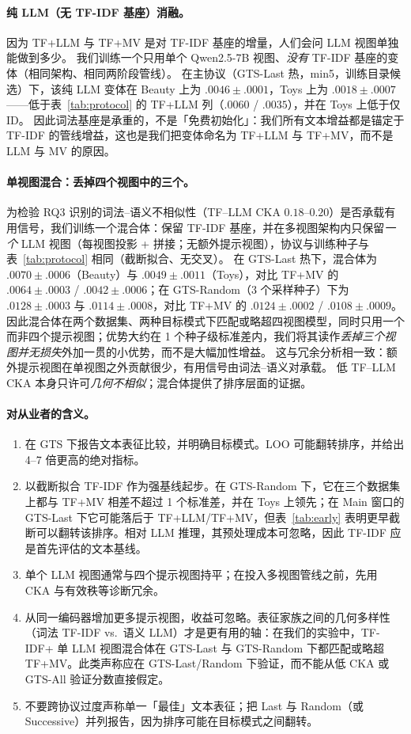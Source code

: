 \documentclass[sigconf,natbib=true,anonymous]{acmart}
\newcommand{\tfidf}{\textsc{TF-IDF}\xspace}
\newcommand{\llm}{\textsc{LLM}\xspace}
\newcommand{\tfllm}{\textsc{TF+LLM}\xspace}
\newcommand{\tfmv}{\textsc{TF+MV}\xspace}
\begin{document}
\paragraph{纯 LLM（无 \tfidf 基座）消融。}
因为 \tfllm 与 \tfmv 是对 \tfidf 基座的增量，人们会问 LLM 视图单独能做到多少。
我们训练一个只用单个 Qwen2.5-7B 视图、\emph{没有} \tfidf 基座的变体（相同架构、相同两阶段管线）。
在主协议（GTS-Last 热，min5，训练目录候选）下，该纯 LLM 变体在 Beauty 上为 $.0046\pm.0001$，Toys 上为 $.0018\pm.0007$——低于表~\ref{tab:protocol} 的 \tfllm 列（$.0060$ / $.0035$），并在 Toys 上低于仅 ID。
因此词法基座是承重的，不是「免费初始化」：我们所有文本增益都是锚定于 \tfidf 的管线增益，这也是我们把变体命名为 \tfllm 与 \tfmv，而不是 LLM 与 MV 的原因。

\paragraph{单视图混合：丢掉四个视图中的三个。}
为检验 RQ3 识别的词法--语义不相似性（TF--LLM CKA $0.18$--$0.20$）是否承载有用信号，我们训练一个混合体：保留 \tfidf 基座，并在多视图架构内只保留\emph{一个} LLM 视图（每视图投影 + 拼接；无额外提示视图），协议与训练种子与表~\ref{tab:protocol} 相同（截断拟合、无交叉）。
在 GTS-Last 热下，混合体为 $.0070\pm.0006$（Beauty）与 $.0049\pm.0011$（Toys），对比 \tfmv 的 $.0064\pm.0003$ / $.0042\pm.0006$；在 GTS-Random（3 个采样种子）下为 $.0128\pm.0003$ 与 $.0114\pm.0008$，对比 \tfmv 的 $.0124\pm.0002$ / $.0108\pm.0009$。
因此混合体在两个数据集、两种目标模式下匹配或略超四视图模型，同时只用一个而非四个提示视图；优势大约在 1 个种子级标准差内，我们将其读作\emph{丢掉三个视图并无损失}外加一贯的小优势，而不是大幅加性增益。
这与冗余分析相一致：额外提示视图在单视图之外贡献很少，有用信号由词法--语义对承载。
低 TF--LLM CKA 本身只许可\emph{几何不相似}；混合体提供了排序层面的证据。

\paragraph{对从业者的含义。}
\begin{enumerate}[leftmargin=*,itemsep=2pt]
\item 在 GTS 下报告文本表征比较，并明确目标模式。LOO 可能翻转排序，并给出 4--7 倍更高的绝对指标。
\item 以截断拟合 \tfidf 作为强基线起步。在 GTS-Random 下，它在三个数据集上都与 \tfmv 相差不超过 1 个标准差，并在 Toys 上领先；在 Main 窗口的 GTS-Last 下它可能落后于 \tfllm/\tfmv，但表~\ref{tab:early} 表明更早截断可以翻转该排序。相对 LLM 推理，其预处理成本可忽略，因此 TF-IDF 应是首先评估的文本基线。
\item 单个 \llm 视图通常与四个提示视图持平；在投入多视图管线之前，先用 CKA 与有效秩等诊断冗余。
\item 从同一编码器增加更多提示视图，收益可忽略。表征家族之间的几何多样性（词法 \tfidf vs.\ 语义 \llm）才是更有用的轴：在我们的实验中，\tfidf + 单 LLM 视图混合体在 GTS-Last 与 GTS-Random 下都匹配或略超 \tfmv。此类声称应在 GTS-Last/Random 下验证，而不能从低 CKA 或 GTS-All 验证分数直接假定。
\item 不要跨协议过度声称单一「最佳」文本表征；把 Last 与 Random（或 Successive）并列报告，因为排序可能在目标模式之间翻转。
\end{enumerate}
\end{document}
